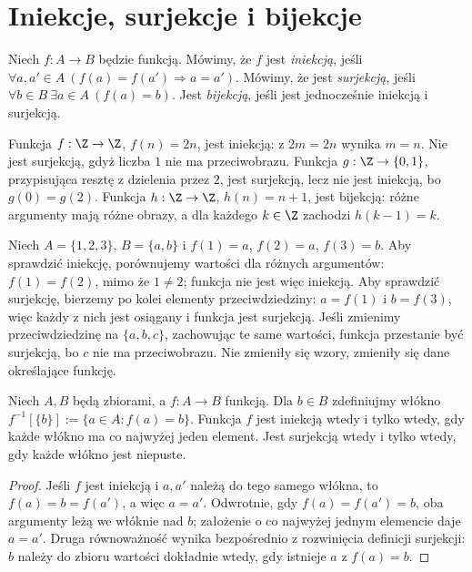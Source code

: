 \section{Iniekcje, surjekcje i bijekcje}
\begin{definicja}\label{def:inj-surj-bij}
Niech $f:A\to B$ będzie funkcją. Mówimy, że $f$ jest \emph{iniekcją}, jeśli $\forall a,a'\in A\ (f(a)=f(a')\Rightarrow a=a')$. Mówimy, że jest \emph{surjekcją}, jeśli $\forall b\in B\ \exists a\in A\ (f(a)=b)$. Jest \emph{bijekcją}, jeśli jest jednocześnie iniekcją i surjekcją.
\end{definicja}
\begin{przyklad}
Funkcja $f:\Z\to\Z$, $f(n)=2n$, jest iniekcją: z $2m=2n$ wynika $m=n$. Nie jest surjekcją, gdyż liczba $1$ nie ma przeciwobrazu. Funkcja $g:\Z\to\{0,1\}$, przypisująca resztę z dzielenia przez $2$, jest surjekcją, lecz nie jest iniekcją, bo $g(0)=g(2)$. Funkcja $h:\Z\to\Z$, $h(n)=n+1$, jest bijekcją: różne argumenty mają różne obrazy, a dla każdego $k\in\Z$ zachodzi $h(k-1)=k$.
\end{przyklad}

\begin{przyklad}
Niech $A=\{1,2,3\}$, $B=\{a,b\}$ i
$f(1)=a$, $f(2)=a$, $f(3)=b$.
Aby sprawdzić iniekcję, porównujemy wartości dla różnych
argumentów: $f(1)=f(2)$, mimo że $1\ne2$; funkcja nie
jest więc iniekcją. Aby sprawdzić surjekcję, bierzemy
po kolei elementy przeciwdziedziny: $a=f(1)$ i $b=f(3)$,
więc każdy z nich jest osiągany i funkcja jest surjekcją.
Jeśli zmienimy przeciwdziedzinę na $\{a,b,c\}$, zachowując
te same wartości, funkcja przestanie być surjekcją, bo $c$
nie ma przeciwobrazu. Nie zmieniły się wzory, zmieniły się
dane określające funkcję.
\end{przyklad}

\begin{twierdzenie}\label{thm:fibres}
Niech $A,B$ będą zbiorami, a $f:A\to B$ funkcją.
Dla $b\in B$ zdefiniujmy włókno $f^{-1}[\{b\}]:=\{a\in A:f(a)=b\}$. Funkcja $f$ jest iniekcją wtedy i tylko wtedy, gdy każde włókno ma co najwyżej jeden element. Jest surjekcją wtedy i tylko wtedy, gdy każde włókno jest niepuste.
\end{twierdzenie}
\begin{proof}
Jeśli $f$ jest iniekcją i $a,a'$ należą do tego samego włókna, to $f(a)=b=f(a')$, a więc $a=a'$. Odwrotnie, gdy $f(a)=f(a')=b$, oba argumenty leżą we włóknie nad $b$; założenie o co najwyżej jednym elemencie daje $a=a'$. Druga równoważność wynika bezpośrednio z rozwinięcia definicji surjekcji: $b$ należy do zbioru wartości dokładnie wtedy, gdy istnieje $a$ z $f(a)=b$.
\end{proof}


